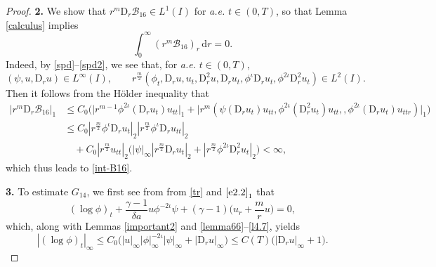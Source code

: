 \documentclass[11pt,reqno]{amsart}
\numberwithin{rk}{section}
\numberwithin{prop}{section}
\numberwithin{mydef}{section}
\numberwithin{lem}{section}
\numberwithin{equation}{section}
\numberwithin{thm}{section}
\begin{document}
\begin{proof}
\smallskip
\textbf{2.} We show that $r^m \mathrm{D}_r  \mathcal{B}_{16} \in L^1(I)$  for {\it a.e.} $t\in (0,T)$, so that Lemma \ref{calculus} implies
\begin{equation}\label{int-B16}
\int_0^\infty (r^m\mathcal{B}_{16})_r\,\mathrm{d}r =0.
\end{equation}
Indeed, by \eqref{spd}--\eqref{spd2}, we see that, for {\it a.e.} $t\in (0,T)$,
\begin{equation*}
(\psi,u,\mathrm{D}_r u)\in L^\infty(I), \qquad 
r^\frac{m}{2}(\phi_t,\mathrm{D}_r u,u_t,\mathrm{D}_r^2 u,\mathrm{D}_r u_t,\phi^\iota \mathrm{D}_r u_t,\phi^{2\iota}\mathrm{D}_r^2 u_t)\in L^2(I).
\end{equation*}
Then it follows from the H\"older inequality that
\begin{equation*} 
\begin{aligned}
|r^m \mathrm{D}_r \mathcal{B}_{16}|_1&\leq C_0\big(\big|r^{m-1}\phi^{2\iota}(\mathrm{D}_r u_t) u_{tt}\big|_1 + \big|r^{m} (\psi (\mathrm{D}_r u_t)u_{tt},\phi^{2\iota}(\mathrm{D}_r^2 u_t)u_{tt},,\phi^{2\iota}(\mathrm{D}_r u_t)u_{ttr})\big|_1\big)\\
&\leq C_0 |r^\frac{m}{2}\phi^\iota\mathrm{D}_r u_t|_2|r^\frac{m}{2}\phi^\iota\mathrm{D}_r u_{tt}|_2 \\
&\quad +C_0|r^\frac{m}{2}u_{tt}|_2\big(|\psi|_\infty|r^\frac{m}{2}\mathrm{D}_r u_t|_2+|r^\frac{m}{2} \phi^{2\iota}\mathrm{D}_r^2 u_t|_2\big) <\infty,
\end{aligned}    
\end{equation*}
which thus leads to \eqref{int-B16}.


\smallskip
\textbf{3.} To estimate $G_{14}$, we first see from from \eqref{tr} and $\eqref{e2.2}_1$ that
\begin{equation}\label{eq:logphi}
(\log\phi)_t+\frac{\gamma-1}{\delta a}u \phi^{-2\iota} \psi+(\gamma-1)\big(u_r+\frac{m}{r}u\big)=0,
\end{equation}
which, along with Lemmas \ref{important2} and \ref{lemma66}--\ref{l4.7}, yields
\begin{equation}\label{logphi}
|(\log\phi)_t|_\infty\leq C_0 \big(|u|_\infty|\phi|_\infty^{-2\iota}|\psi|_\infty+|\mathrm{D}_ru|_\infty\big)\leq C(T)\big(|\mathrm{D}_ru|_\infty+1\big).
\end{equation}


\end{proof}
\end{document}
